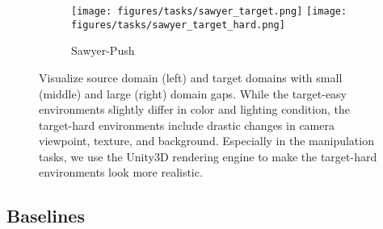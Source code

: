 \begin{figure}[t]
\begin{subfigure}[t]{\linewidth}
        \texttt{[image: figures/tasks/sawyer\_target.png]}        
        \texttt{[image: figures/tasks/sawyer\_target\_hard.png]}
        \caption{Sawyer-Push}
    \end{subfigure}
    \caption{
        Visualize source domain (left) and target domains with small (middle) and large (right) domain gaps. While the target-easy environments slightly differ in color and lighting condition, the target-hard environments include drastic changes in camera viewpoint, texture, and background. Especially in the manipulation tasks, we use the Unity3D rendering engine to make the target-hard environments look more realistic. 
    }
    \label{fig:tasks}
\end{figure}


\subsection{Baselines}

